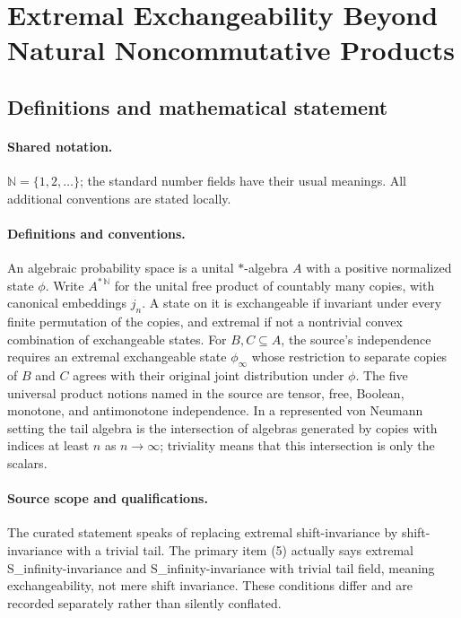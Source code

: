 \documentclass[11pt]{article}
\begin{document}
\section{Extremal Exchangeability Beyond Natural Noncommutative Products}\label{statement}

\subsection{Definitions and mathematical statement}

\paragraph{Shared notation.}$\mathbb N=\{1,2,\ldots\}$; the standard number fields have their usual meanings. All additional conventions are stated locally.


\paragraph{Definitions and conventions.} An algebraic probability space is a unital $*$-algebra $A$ with a positive normalized state $\phi$. Write $A^{*\,\mathbb N}$ for the unital free product of countably many copies, with canonical embeddings $j_n$. A state on it is exchangeable if invariant under every finite permutation of the copies, and extremal if not a nontrivial convex combination of exchangeable states. For $B,C\subseteq A$, the source's independence requires an extremal exchangeable state $\phi_\infty$ whose restriction to separate copies of $B$ and $C$ agrees with their original joint distribution under $\phi$. The five universal product notions named in the source are tensor, free, Boolean, monotone, and antimonotone independence. In a represented von Neumann setting the tail algebra is the intersection of algebras generated by copies with indices at least $n$ as $n\to\infty$; triviality means that this intersection is only the scalars.

\paragraph{Source scope and qualifications.} The curated statement speaks of replacing extremal shift-invariance by shift-invariance with a trivial tail. The primary item (5) actually says extremal S\_infinity-invariance and S\_infinity-invariance with trivial tail field, meaning exchangeability, not mere shift invariance. These conditions differ and are recorded separately rather than silently conflated.
\end{document}
